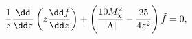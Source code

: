 \begin{equation}
{1\over z} {\dd\over \dd z} \left( z {\dd \tilde f\over \dd z}\right)
+ \left( {10 M_\chi^2\over |\Lambda|} - \frac{25}{4 z^2} \right)
\tilde f =0,
\end{equation}

